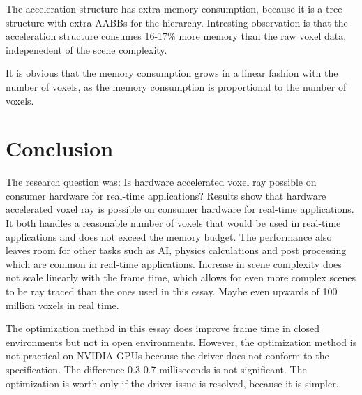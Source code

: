 \documentclass[12pt]{article}
\begin{document}
The acceleration structure has extra memory consumption, because it is a tree structure
with extra AABBs for the hierarchy. Intresting observation is that the 
acceleration structure consumes 16-17\% more memory than the raw voxel data, 
indepenedent of the scene complexity.

It is obvious that the memory consumption grows in a linear fashion with the number of voxels,
as the memory consumption is proportional to the number of voxels. 

\section{Conclusion}


The research question was: Is hardware accelerated voxel ray possible on consumer hardware for real-time applications?
Results show that hardware accelerated voxel ray is possible on consumer hardware for real-time applications.
It both handles a reasonable number of voxels that would be used in real-time applications and does not exceed the memory budget.
The performance also leaves room for other tasks such as AI, physics calculations and post processing which are common in real-time applications.
Increase in scene complexity does not scale linearly with the frame time, which allows for even more complex scenes
to be ray traced than the ones used in this essay. Maybe even upwards of 100 million voxels in real time. 

The optimization method in this essay does improve frame time in closed environments but not in open environments.
However, the optimization method is not practical on NVIDIA GPUs because the driver does not conform to the specification.
The difference 0.3-0.7 milliseconds is not significant. The optimization is worth only if the driver issue is resolved,
because it is simpler.

\printbibliography
\end{document}
